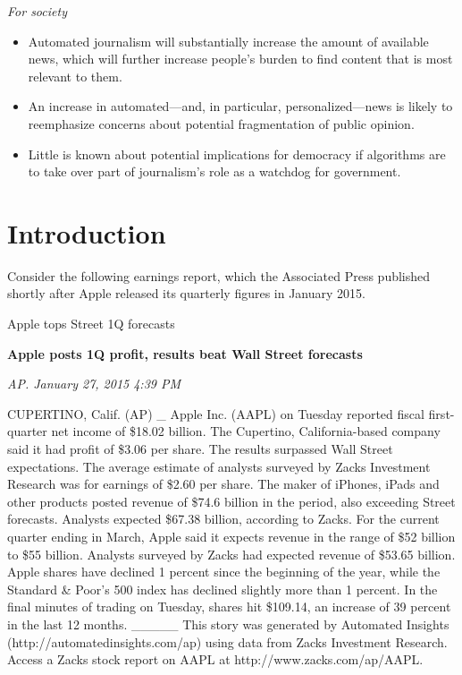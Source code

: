 \documentclass[notoc, symmetric, nobib, nols]{towcenter-guideto-book}
\begin{document}
\textit{For society}
\begin{itemize}
\item Automated journalism will substantially increase the amount of available news, which will further increase people's burden to find content that is most relevant to them. 
\item An increase in automated---and, in particular, personalized---news is likely to reemphasize concerns about potential fragmentation of public opinion.
\item Little is known about potential implications for democracy if algorithms are to take over part of journalism's role as a watchdog for government.  
\end{itemize}

\chapter{Introduction}

Consider the following earnings report, which the Associated Press published shortly after Apple released its quarterly figures in January 2015.

\begin{framed}
Apple tops Street 1Q forecasts

\textbf{Apple posts 1Q profit, results beat Wall Street forecasts}

\textit{AP. January 27, 2015 4:39 PM}

CUPERTINO, Calif. (AP) \_ Apple Inc. (AAPL) on Tuesday reported fiscal first-quarter net income of \$18.02 billion. The Cupertino, California-based company said it had profit of \$3.06 per share. The results surpassed Wall Street expectations. The average estimate of analysts surveyed by Zacks Investment Research was for earnings of \$2.60 per share. The maker of iPhones, iPads and other products posted revenue of \$74.6 billion in the period, also exceeding Street forecasts. Analysts expected \$67.38 billion, according to Zacks. For the current quarter ending in March, Apple said it expects revenue in the range of \$52 billion to \$55 billion. Analysts surveyed by Zacks had expected revenue of \$53.65 billion. Apple shares have declined 1 percent since the beginning of the year, while the Standard \& Poor's 500 index has declined slightly more than 1 percent. In the final minutes of trading on Tuesday, shares hit \$109.14, an increase of 39 percent in the last 12 months.
\_\_\_\_\_
This story was generated by Automated Insights (http://automatedinsights.com/ap) using data from Zacks Investment Research. Access a Zacks stock report on AAPL at http://www.zacks.com/ap/AAPL.
\end{framed}
\end{document}
